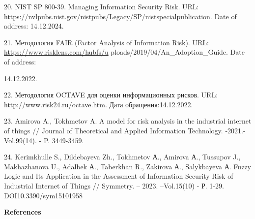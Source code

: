 \begin{references}
20. NIST SP 800-39. Managing Information Security Risk. URL:
https://nvlpubs.nist.gov/nistpubs/Legacy/SP/nistspecialpublication. Date
of address: 14.12.2024.

21. Методология FAIR (Factor Analysis of Information Risk). URL:
\url{https://www.risklens.com/hubfs/u}
ploads/2019/04/An\_Adoption\_Guide. Date of address:

14.12.2022.

22. Методология OCTAVE для оценки информационных рисков. URL:
http://www.risk24.ru/octave.htm. Дата обращения:14.12.2022.

23. Amirova A., Tokhmetov A. A model for risk analysis in the industrial
internet of things // Journal of Theoretical and Applied Information
Technology. -2021.- Vol.99(14). - P. 3449-3459.

24. Kerimkhulle S., Dildebayeva Zh., Tokhmetov А., Amirova А., Tussupov
J., Makhazhanova U., Adalbek А., Taberkhan R., Zakirova А., Salykbayeva
А. Fuzzy Logic and Its Application in the Assessment of Information
Security Risk of Industrial Internet of Things // Symmetry. -- 2023.
--Vol.15(10) - Р. 1-29. DOI10.3390/sym15101958
\end{references}

\begin{center}
{\bfseries References}
\end{center}

